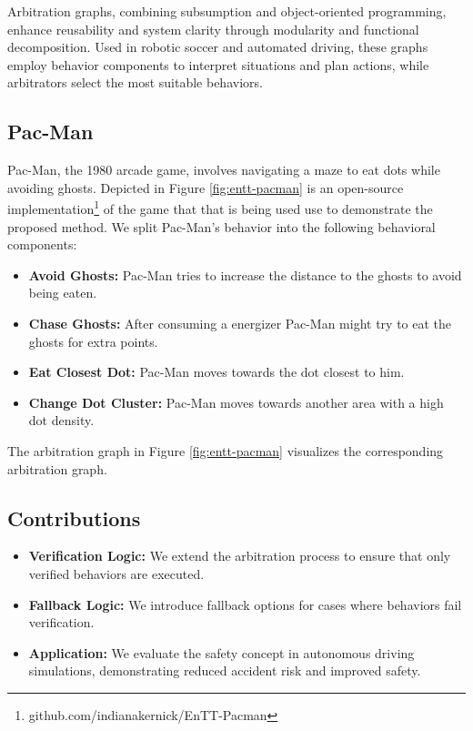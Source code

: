 Arbitration graphs, combining subsumption and object-oriented programming, enhance reusability and system clarity through modularity and functional decomposition. Used in robotic soccer and automated driving, these graphs employ behavior components to interpret situations and plan actions, while arbitrators select the most suitable behaviors.

\subsection{Pac-Man}
Pac-Man, the 1980 arcade game, involves navigating a maze to eat dots while avoiding ghosts.
Depicted in Figure \ref{fig:entt-pacman} is an open-source implementation\footnote{github.com/indianakernick/EnTT-Pacman}  of the game that that is being used use to demonstrate the proposed method.
We split Pac-Man's behavior into the following behavioral components:

\begin{itemize}
    \item \textbf{Avoid Ghosts:} Pac-Man tries to increase the distance to the ghosts to avoid being eaten.
    \item \textbf{Chase Ghosts:} After consuming a energizer Pac-Man might try to eat the ghosts for extra points.
    \item \textbf{Eat Closest Dot:} Pac-Man moves towards the dot closest to him.
    \item \textbf{Change Dot Cluster:} Pac-Man moves towards another area with a high dot density.
\end{itemize}

The arbitration graph in Figure \ref{fig:entt-pacman} visualizes the corresponding arbitration graph.

\subsection{Contributions}

\begin{itemize}
\item \textbf{Verification Logic:} We extend the arbitration process to ensure that only verified behaviors are executed.
\item \textbf{Fallback Logic:} We introduce fallback options for cases where behaviors fail verification.
\item \textbf{Application:} We evaluate the safety concept in autonomous driving simulations, demonstrating reduced accident risk and improved safety.
\end{itemize}

